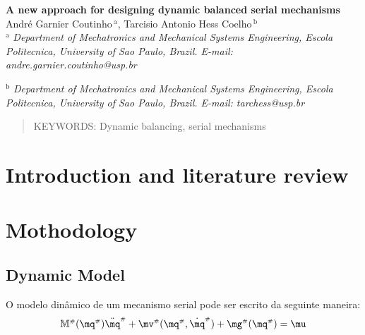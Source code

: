 \documentclass[a4paper,11pt,brazil,fleqn]{article}
\begin{document}

\noindent
{\bf \huge A new approach for designing dynamic balanced serial mechanisms}\\

\noindent
{\Large 		Andr\'e Garnier Coutinho$\,{}^\text{a}$,
			Tarcisio Antonio Hess Coelho$\,{}^\text{b}$
}\\

\noindent
{${}^\text{a}$ \it Department of Mechatronics and Mechanical Systems Engineering, Escola Politecnica, 
University of Sao Paulo, Brazil. E-mail: andre.garnier.coutinho@usp.br}

\noindent
{${}^\text{b}$ \it Department of Mechatronics and Mechanical Systems Engineering, Escola Politecnica, 
University of Sao Paulo, Brazil. E-mail: tarchess@usp.br}

\vspace{24pt}


\begin{abstract}


\vspace{10pt}

\noindent
KEYWORDS: {Dynamic balancing, serial mechanisms}
\end{abstract}







\section{Introduction and literature review}\label{S01}



\section{Mothodology}\label{S02}

\subsection{Dynamic Model}\label{S02-1}

O modelo din\^{a}mico de um mecanismo serial pode ser escrito da seguinte maneira:
\begin{equation}
\mM\ssh (\mq\ssh) \ddot{\mq}\ssh + \mv\ssh(\mq\ssh,\dot{\mq}\ssh) + \mg\ssh (\mq\ssh) = \mu
\end{equation}
\end{document}
